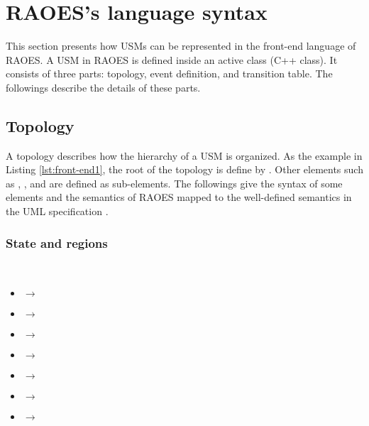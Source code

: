 \section{RAOES's language syntax}
\label{sec:syntax}
This section presents how USMs can be represented in the front-end language of RAOES.
A USM in RAOES is defined inside an active class (C++ class).
It consists of three parts: topology, event definition, and transition table.
The followings describe the details of these parts.
\subsection{Topology}
A topology describes how the hierarchy of a USM is organized.
As the example in Listing \ref{lst:front-end1}, the root of the topology is define by .
Other elements such as , , and  are defined as sub-elements.
The followings give the syntax of some elements and the semantics of RAOES mapped to the well-defined semantics in the UML specification \cite{OMG2015}.

\subsubsection{State and regions} ~\\
\begin{itemize}[\footnotesize]
\item {} $\rightarrow$  

\item {} $\rightarrow$  

\item {} $\rightarrow$ 

\item {} $\rightarrow$  

\item {} $\rightarrow$ 

\item {} $\rightarrow$ 

\item {} $\rightarrow$ 
\end{itemize}

